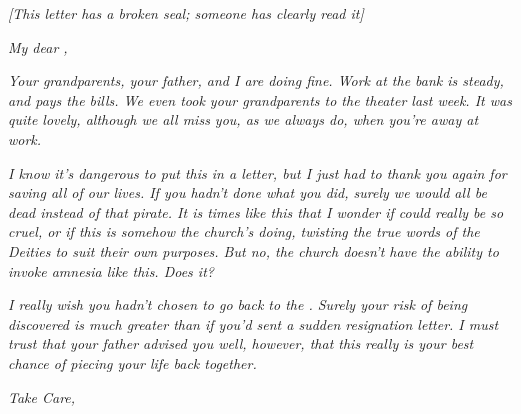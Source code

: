 \documentclass[white]{GL2020}
\begin{document}
\name{\wLibLetter{}}

\emph{[This letter has a broken seal; someone has clearly read it]}

\vspace{1cm}

\textsl{My dear \cLibrarian{},}

\vspace{0.5cm}

\textsl{Your grandparents, your father, and I are doing fine. Work at the bank is steady, and pays the bills. We even took your grandparents to the theater last week. It was quite lovely, although we all miss you, as we always do, when you’re away at work.}

\textsl{I know it’s dangerous to put this in a letter, but I just had to thank you again for saving all of our lives. If you hadn’t done what you did, surely we would all be dead instead of that pirate. It is times like this that I wonder if \cTechGod{} could really be so cruel, or if this is somehow the church’s doing, twisting the true words of the Deities to suit their own purposes. But no, the church doesn’t have the ability to invoke amnesia like this. Does it?}

\textsl{I really wish you hadn’t chosen to go back to the \pSchool{}. Surely your risk of being discovered is much greater than if you’d sent a sudden resignation letter. I must trust that your father advised you well, however, that this really is your best chance of piecing your life back together.}

\vspace{0.5cm}

\textsl{Take Care,}\\
\textsl{\cLibrarianMom{\full}}
\end{document}
